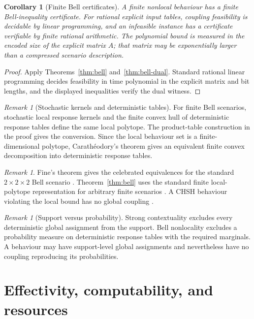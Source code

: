 \documentclass[11pt]{article}
\theoremstyle{plain}
\newtheorem{corollary}[theorem]{Corollary}
\theoremstyle{definition}
\theoremstyle{remark}
\newtheorem{remark}[theorem]{Remark}
\begin{document}
\begin{corollary}[Finite Bell certificates]\label{cor:bell-certificates}
A finite nonlocal behaviour has a finite Bell-inequality certificate. For
rational explicit input tables, coupling feasibility is decidable by linear
programming, and an infeasible instance has a certificate verifiable by finite
rational arithmetic. The polynomial bound is measured in the encoded size of
the explicit matrix $A$; that matrix may be exponentially larger than a
compressed scenario description.
\end{corollary}

\begin{proof}
Apply Theorems~\ref{thm:bell} and~\ref{thm:bell-dual}. Standard rational linear
programming decides feasibility in time polynomial in the explicit matrix and
bit lengths, and the displayed inequalities verify the dual witness.
\end{proof}

\begin{remark}[Stochastic kernels and deterministic tables]
For finite Bell scenarios, stochastic local response kernels and the finite
convex hull of deterministic response tables define the same local polytope. The
product-table construction in the proof gives the conversion. Since the local
behaviour set is a finite-dimensional polytope, Carath\'eodory's theorem gives
an equivalent finite convex decomposition into deterministic response tables.
\end{remark}

\begin{remark}
Fine's theorem gives the celebrated equivalences for the standard
$2\times2\times2$ Bell scenario \cite{fine}. Theorem~\ref{thm:bell} uses the
standard finite local-polytope representation for arbitrary finite scenarios
\cite{pitowsky}. A CHSH behaviour violating the local bound has no global coupling
\cite{chsh}.
\end{remark}

\begin{remark}[Support versus probability]
Strong contextuality excludes every deterministic global assignment from the
support. Bell nonlocality excludes a probability measure on deterministic
response tables with the required marginals. A behaviour may have support-level
global assignments and nevertheless have no coupling reproducing its
probabilities.
\end{remark}

\section{Effectivity, computability, and resources}\label{sec:effect}
\end{document}
